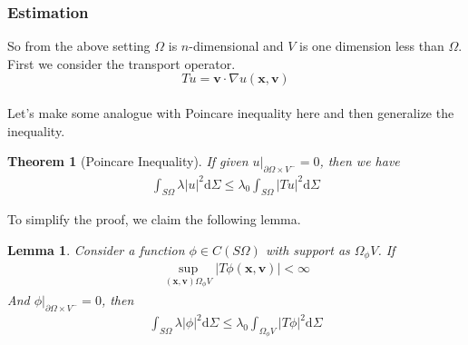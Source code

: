 \documentclass[12pt,a4paper]{article}
\newtheorem{theorem}{Theorem}[subsection]
\newtheorem{lemma}{Lemma}[subsection]
\begin{document}
\subsubsection{Estimation}
So from the above setting $\Omega$ is $n$-dimensional and $V$ is one dimension less than $\Omega$.
First we consider the transport operator.
$$Tu = \mathbf{v}\cdot \nabla u(\mathbf{x},\mathbf{v})$$\\
Let's make some analogue with Poincare inequality here and then generalize the inequality.
\begin{theorem}[Poincare Inequality]
If given $u|_{\partial \Omega\times V^{-}} = 0$, then we have 
\begin{eqnarray}
\int_{S\Omega} \lambda|u|^2 \mathrm{d}\Sigma \le \lambda_0\int_{S\Omega}|Tu|^2 \mathrm{d}\Sigma
\end{eqnarray}
\end{theorem}
To simplify the proof, we claim the following lemma.
\begin{lemma}
Consider a function $\phi\in C(S\Omega)$ with support as $\Omega_{\phi}V$. If
\begin{eqnarray}
\sup_{(\mathbf{x},\mathbf{v})\Omega_{\phi} V} |T\phi(\mathbf{x},\mathbf{v})| < \infty
\end{eqnarray}
And $\phi|_{\partial\Omega\times V^{-}} = 0$, then
\begin{eqnarray}
\int_{S\Omega}\lambda |\phi|^2 \mathrm{d}\Sigma \le \lambda_0\int_{\Omega_{\phi}V} |T\phi|^2 \mathrm{d}\Sigma
\end{eqnarray}
\end{lemma}
\end{document}
